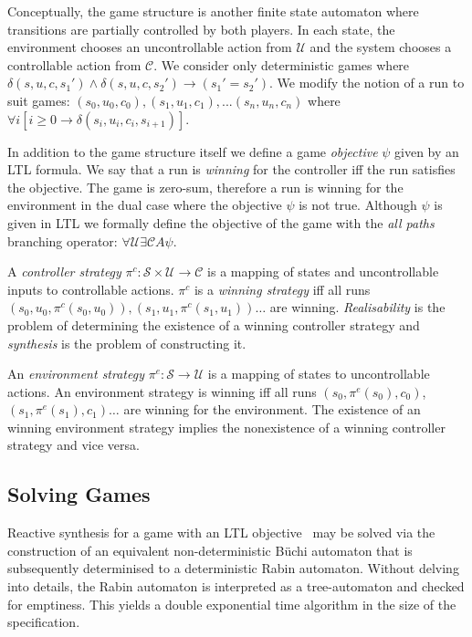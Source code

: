 Conceptually, the game structure is another finite state automaton where transitions are partially controlled by both players. In each state, the environment chooses an uncontrollable action from $\mathcal{U}$ and the system chooses a controllable action from $\mathcal{C}$. We consider only deterministic games where $\delta(s, u, c, s_1') \land \delta(s, u, c, s_2') \to (s_1' = s_2')$.  We modify the notion of a run to suit games: $(s_0, u_0, c_0), (s_1, u_1, c_1), ... (s_n, u_n, c_n)$ where $\forall i [i \geq 0 \to \delta(s_i, u_i, c_i, s_{i+1})]$. 

In addition to the game structure itself we define a game \emph{objective} $\psi$ given by an LTL formula. We say that a run is \emph{winning} for the controller iff the run satisfies the objective. The game is zero-sum, therefore a run is winning for the environment in the dual case where the objective $\psi$ is not true. Although $\psi$ is given in LTL we formally define the objective of the game with the \emph{all paths} branching operator: $\forall \mathcal{U} \exists \mathcal{C} A \psi$.


A \emph{controller strategy} $\pi^c : \mathcal{S} \times \mathcal{U} \to \mathcal{C}$ is a mapping of states and uncontrollable inputs to controllable actions. $\pi^c$ is a \emph{winning strategy} iff all runs $(s_0, u_0, \pi^c(s_0, u_0)), (s_1, u_1, \pi^c(s_1, u_1)) \dots$ are winning. \emph{Realisability} is the problem of determining the existence of a winning controller strategy and \emph{synthesis} is the problem of constructing it.

An \emph{environment strategy} $\pi^e : \mathcal{S} \to \mathcal{U}$ is a mapping of states to uncontrollable actions. An environment strategy is winning
iff all runs $(s_0, \pi^e(s_0), c_0)$, $(s_1, \pi^e(s_1), c_1) \dots$ are winning for the environment. The existence of an winning environment strategy implies the nonexistence of a winning controller strategy and vice versa.

\subsection{Solving Games}

Reactive synthesis for a game with an LTL objective~\cite{Pnueli89} may be solved via the construction of an equivalent non-deterministic B\"uchi automaton that is subsequently determinised to a deterministic Rabin automaton. Without delving into details, the Rabin automaton is interpreted as a tree-automaton and checked for emptiness. This yields a double exponential time algorithm in the size of the specification.

